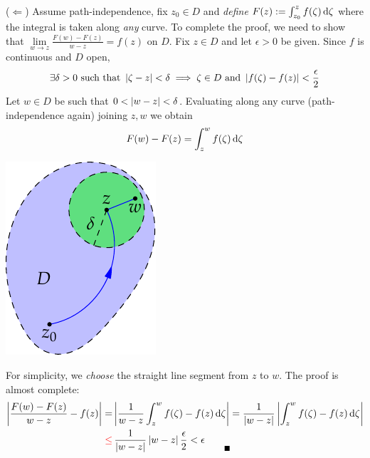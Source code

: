 \begin{tcolorbox}[proofstyle]
	\begin{description}
		\begin{minipage}[t]{0.76\linewidth}\vspace{0pt}
			\item[\normalfont ($\Leftarrow$)] Assume path-independence, fix $z_0\in D$ and \emph{define} $F(z):=\int_{z_0}^zf(\zeta)\,\mathrm{d}\zeta$ where the integral is taken along \emph{any} curve. To complete the proof, we need to show that $\lim\limits_{w\to z}\frac{F(w)-F(z)}{w-z}=f(z)$ on $D$.\smallbreak
			Fix $z\in D$ and let $\epsilon>0$ be given. Since $f$ is continuous and $D$ open,
			\[
				\exists \delta>0\ \text{such that}\  \nm{\zeta-z}<\delta\implies \zeta\in D\ \text{and}\ \nm{f(\zeta)-f(z)}<\frac\epsilon 2
			\]
			Let $w\in D$ be such that $0<\left| w-z\right|<\delta$. Evaluating along any curve (path-independence again) joining $z,w$ we obtain
			\[
				F(w)-F(z)=\int_z^wf(\zeta)\,\mathrm{d}\zeta
			\]
			\end{minipage}
			\hfill
			\begin{minipage}[t]{0.22\linewidth}\vspace{0pt}
				\flushright\includegraphics[scale=0.95]{ftc-2}
			\end{minipage}\medbreak
			For simplicity, we \emph{choose} the straight line segment from $z$ to $w$. The proof is almost complete:
			\begin{align*}
				\nm{\frac{F(w)-F(z)}{w-z}-f(z)}=&\nm{\frac 1{w-z}\int_z^wf(\zeta)-f(z)\,\D\zeta} = \frac 1{\nm{w-z}}\nm{\int_z^wf(\zeta)-f(z)\,\D\zeta}\\
				\textcolor{red}{\le}&\,\frac 1{\nm{w-z}}\nm{w-z}\frac\epsilon 2<\epsilon \tag*{\qedsymbol}
			\end{align*}
		\end{description}
\end{tcolorbox}

